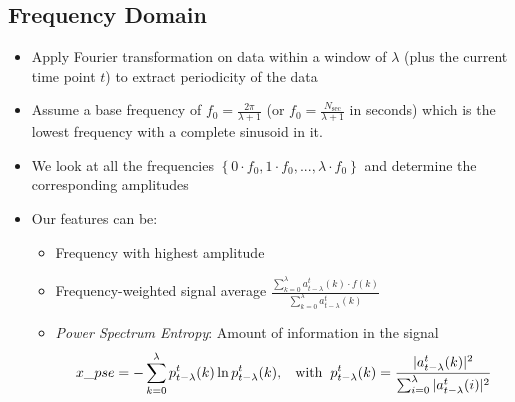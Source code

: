 \subsection{Frequency Domain}
\begin{itemize}
	\item Apply Fourier transformation on data within a window of $\lambda$ (plus the current time point $t$) to extract periodicity of the data
	\item Assume a base frequency of $f_0 = \frac{2\pi}{\lambda+1}$ (or $f_0 = \frac{N_{\text{sec}}}{\lambda+1}$ in seconds) which is the lowest frequency with a complete sinusoid in it. 
	\item We look at all the frequencies $\left\{0\cdot f_0, 1\cdot f_0, ..., \lambda \cdot f_0\right\}$ and determine the corresponding amplitudes
	\item Our features can be:
	\begin{itemize}
		\item Frequency with highest amplitude
		\item Frequency-weighted signal average $\frac{\sum_{k=0}^{\lambda} a_{t-\lambda}^{t}(k) \cdot f(k)}{\sum_{k=0}^{\lambda} a_{t-\lambda}^{t}(k)}$
		\item \textit{Power Spectrum Entropy}: Amount of information in the signal
		$$x\_pse = - \sum_{k=0}^{\lambda} p_{t-\lambda}^{t}(k) \ln p_{t-\lambda}^{t}(k), \hspace{3mm}\text{with}\hspace{2mm} p_{t-\lambda}^{t}(k) = \frac{|a_{t-\lambda}^{t}(k)|^2}{\sum_{i=0}^{\lambda} |a_{t-\lambda}^{t}(i)|^2}$$
	\end{itemize}
\end{itemize}
